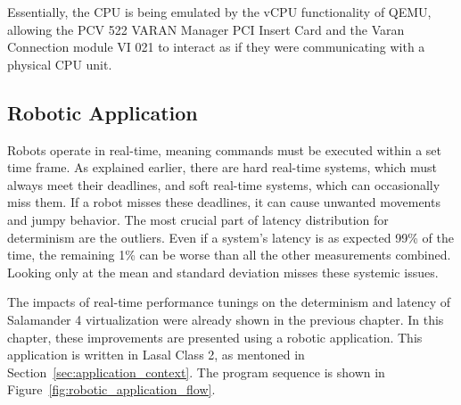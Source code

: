 \documentclass[MMR,Master,english]{twbook}
\begin{document}
\noindent Essentially, the CPU is being emulated by the vCPU functionality of QEMU, allowing the PCV 522 VARAN Manager PCI Insert Card and the Varan Connection module VI 021 to interact as if they were communicating with a physical CPU unit.

\subsection{Robotic Application}

Robots operate in real-time, meaning commands must be executed within a set time frame. As explained earlier, there are hard real-time systems, which must always meet their deadlines, and soft real-time systems, which can occasionally miss them. If a robot misses these deadlines, it can cause unwanted movements and jumpy behavior. The most crucial part of latency distribution for determinism are the outliers. Even if a system's latency is as expected 99\% of the time, the remaining 1\% can be worse than all the other measurements combined. Looking only at the mean and standard deviation misses these systemic issues.

\bigskip \noindent The impacts of real-time performance tunings on the determinism and latency of Salamander 4 virtualization were already shown in the previous chapter. In this chapter, these improvements are presented using a robotic application. This application is written in Lasal Class 2, as mentoned in Section~\ref{sec:application_context}. The program sequence is shown in Figure~\ref{fig:robotic_application_flow}.

\vspace{2em}
\end{document}
